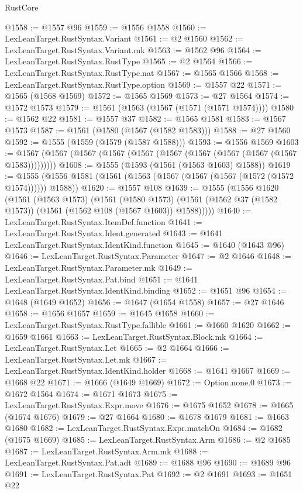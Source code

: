 \begin{lexlean}{RustCore}
\begin{coremodule}
@1558 := @1557 @96
@1559 := @1556 @1558
@1560 := LexLeanTarget.RustSyntax.Variant
@1561 := @2 @1560
@1562 := LexLeanTarget.RustSyntax.Variant.mk
@1563 := @1562 @96
@1564 := LexLeanTarget.RustSyntax.RustType
@1565 := @2 @1564
@1566 := LexLeanTarget.RustSyntax.RustType.nat
@1567 := @1565 @1566
@1568 := LexLeanTarget.RustSyntax.RustType.option
@1569 := @1557 @22
@1571 := @1565 (@1568 @1569)
@1572 := @1565 @1569
@1573 := @27 @1564
@1574 := @1572 @1573
@1579 := @1561 (@1563 (@1567 (@1571 (@1571 @1574))))
@1580 := @1562 @22
@1581 := @1557 @37
@1582 := @1565 @1581
@1583 := @1567 @1573
@1587 := @1561 (@1580 (@1567 (@1582 @1583)))
@1588 := @27 @1560
@1592 := @1555 (@1559 (@1579 (@1587 @1588)))
@1593 := @1556 @1569
@1603 := @1567 (@1567 (@1567 (@1567 (@1567 (@1567 (@1567 (@1567 (@1567 (@1567 @1583)))))))))
@1608 := @1555 (@1593 (@1561 (@1563 @1603) @1588))
@1619 := @1555 (@1556 @1581 (@1561 (@1563 (@1567 (@1567 (@1567 (@1572 (@1572 @1574)))))) @1588))
@1620 := @1557 @108
@1639 := @1555
    (@1556
      @1620
      (@1561
        (@1563 @1573)
        (@1561
          (@1580 @1573)
          (@1561 (@1562 @37 (@1582 @1573)) (@1561 (@1562 @108 (@1567 @1603)) @1588)))))
@1640 := LexLeanTarget.RustSyntax.ItemDef.function
@1641 := LexLeanTarget.RustSyntax.Ident.generated
@1643 := @1641 LexLeanTarget.RustSyntax.IdentKind.function
@1645 := @1640 (@1643 @96)
@1646 := LexLeanTarget.RustSyntax.Parameter
@1647 := @2 @1646
@1648 := LexLeanTarget.RustSyntax.Parameter.mk
@1649 := LexLeanTarget.RustSyntax.Pat.bind
@1651 := @1641 LexLeanTarget.RustSyntax.IdentKind.binding
@1652 := @1651 @96
@1654 := @1648 (@1649 @1652)
@1656 := @1647 (@1654 @1558)
@1657 := @27 @1646
@1658 := @1656 @1657
@1659 := @1645 @1658
@1660 := LexLeanTarget.RustSyntax.RustType.fallible
@1661 := @1660 @1620
@1662 := @1659 @1661
@1663 := LexLeanTarget.RustSyntax.Block.mk
@1664 := LexLeanTarget.RustSyntax.Let
@1665 := @2 @1664
@1666 := LexLeanTarget.RustSyntax.Let.mk
@1667 := LexLeanTarget.RustSyntax.IdentKind.holder
@1668 := @1641 @1667
@1669 := @1668 @22
@1671 := @1666 (@1649 @1669)
@1672 := Option.none.{0}
@1673 := @1672 @1564
@1674 := @1671 @1673
@1675 := LexLeanTarget.RustSyntax.Expr.move
@1676 := @1675 @1652
@1678 := @1665 (@1674 @1676)
@1679 := @27 @1664
@1680 := @1678 @1679
@1681 := @1663 @1680
@1682 := LexLeanTarget.RustSyntax.Expr.matchOn
@1684 := @1682 (@1675 @1669)
@1685 := LexLeanTarget.RustSyntax.Arm
@1686 := @2 @1685
@1687 := LexLeanTarget.RustSyntax.Arm.mk
@1688 := LexLeanTarget.RustSyntax.Pat.adt
@1689 := @1688 @96
@1690 := @1689 @96
@1691 := LexLeanTarget.RustSyntax.Pat
@1692 := @2 @1691
@1693 := @1651 @22

\end{coremodule}
\end{lexlean}
